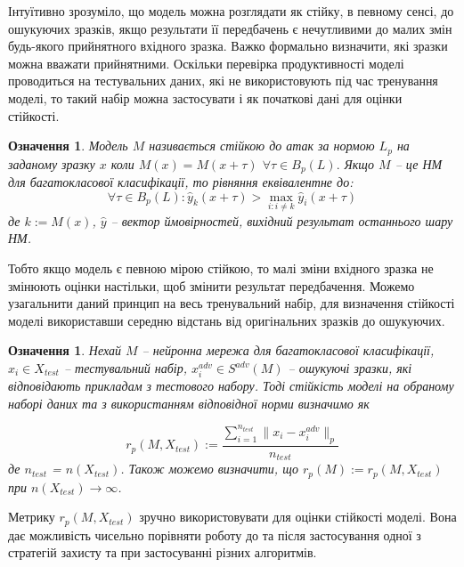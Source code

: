 \documentclass[14pt,a4paper]{extarticle}
\newcounter{e}
\newtheorem{defn}[theorem]{Означення}
\numberwithin{equation}{section}
\numberwithin{figure}{section}
\begin{document}
 Інтуїтивно зрозуміло, що модель можна розглядати як стійку, в певному сенсі, до ошукуючих зразків, якщо результати її передбачень є нечутливими до малих змін будь-якого прийнятного вхідного зразка. Важко формально визначити, які зразки можна вважати прийнятними. Оскільки перевірка продуктивності моделі проводиться на тестувальних даних, які не використовують під час тренування моделі, то такий набір можна застосувати і як початкові дані для оцінки стійкості.
 
 \begin{defn}
 Модель $M$ називається стійкою до атак за нормою $L_p$ на заданому зразку $x$ коли $M(x)=M(x+\tau)$ $\forall \tau \in B_{p}(L) .$ Якщо $M$ -- це НМ для багатокласової класифікації, то рівняння еквівалентне до:
 \begin{equation}
 \forall \tau \in B_{p}(L): \hat{y}_{k}(x+\tau)>\max _{i: i \neq k} \hat{y}_{i}(x+\tau)
 \end{equation}
 де $k:=M(x)$, $\hat{y}$ -- вектор ймовірностей, вихідний результат останнього шару НМ.
 \end{defn}
 
 Тобто якщо модель є певною мірою стійкою, то малі зміни вхідного зразка не змінюють оцінки настільки, щоб змінити результат передбачення. Можемо узагальнити даний принцип на весь тренувальний набір, для визначення стійкості моделі використавши середню відстань від оригінальних зразків до ошукуючих.
 
 \begin{defn}
 Нехай $M$ -- нейронна мережа для багатокласової класифікації, $x_i \in X_{test}$ -- тестувальний набір, $x^{adv}_i \in S^{adv}(M)$ -- ошукуючі зразки, які відповідають прикладам з тестового набору. Тоді стійкість моделі на обраному наборі даних та з використанням відповідної норми визначимо як
 
 \begin{equation}
 \label{robustness-metric}
 r_p(M, X_{test}) := \frac{\sum\limits^{n_{test}}_{i = 1}\|x_i-x^{adv}_i\|_{p}}{n_{test}}
 \end{equation}
 де $n_{test}$ = $n(X_{test})$. Також можемо визначити, що $r_p(M) := r_p(M, X_{test})$ при $ n(X_{test}) \to \infty$.
 
 \end{defn}
 
 Метрику $r_p(M, X_{test})$ зручно використовувати для оцінки стійкості моделі. Вона дає можливість чисельно порівняти роботу до та після застосування одної з стратегій захисту та при застосуванні різних алгоритмів. 
 
\end{document}
